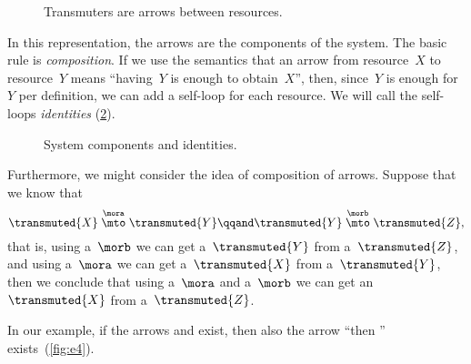 
\begin{figure}[h!]
    \centering
    \caption{Transmuters are arrows between resources.}
    \label{fig:e2}
\end{figure}

In this representation, the arrows are the components of the system.
The basic rule is \emph{composition}.
If we use the semantics that an arrow from resource~$X$ to resource~$Y$ means ``having~$Y$ is enough to obtain~$X$'', then, since~$Y$ is enough for~$Y$ per definition, we can add a self-loop for each resource.
We will call the self-loops \emph{identities} (\cref{fig:e3}).

\begin{figure}[h!]
    \centering
    \caption{System components and identities. }
    \label{fig:e3}
\end{figure}


Furthermore, we might consider the idea of composition of arrows.
Suppose that we know that
%
\begin{equation*}
    \transmuted{X} \stackrel{\mora}{\mto} \transmuted{Y}
    \qqand
    \transmuted{Y} \stackrel{\morb}{\mto} \transmuted{Z},
\end{equation*}
%
that is, using a~$\morb$ we can get a~$\transmuted{Y}$ from a~$\transmuted{Z}$, and using a~$\mora$ we can get a~$\transmuted{X}$ from a~$\transmuted{Y}$, then we conclude that using a~$\mora$ and a~$\morb$ we can get an~$\transmuted{X}$ from a~$\transmuted{Z}$.

In our example, if the arrows \wheels  and \motor exist, then also the arrow ``\wheels then \motor'' exists~(\cref{fig:e4}).

